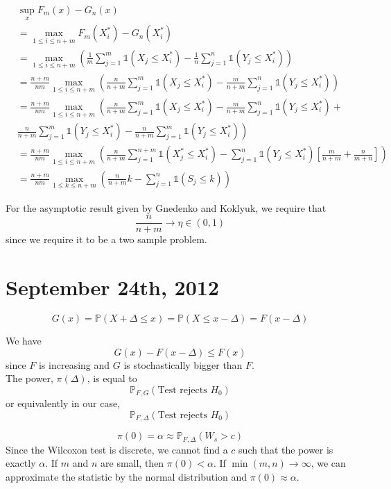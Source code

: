 \documentclass[a4paper,12pt]{amsart}
\newcommand{\p}[1]{\mathbb{P}\left(#1\right)}
\begin{document}
\begin{align*}
&\sup_x F_m(x) - G_n(x)\\
 &= \max_{1 \leq i \leq n+m} F_m(X_i^*) - G_n(X_i^*)\\
&= \max_{1 \leq i \leq n+m} \left(\frac{1}{m}\sum_{j=1}^m \mathds{1}(X_j \leq X_i^*) - \frac{1}{n}\sum_{j=1}^n \mathds{1}(Y_j \leq X_i^*)\right)\\
&= \frac{n+m}{nm}\max_{1 \leq i \leq n+m} \left(\frac{n}{n+m}\sum_{j=1}^m \mathds{1}(X_j \leq X_i^*) - \frac{m}{n+m}\sum_{j=1}^n \mathds{1}(Y_j \leq X_i^*)\right)\\
&= \frac{n+m}{nm}\max_{1 \leq i \leq n+m} \left(\frac{n}{n+m}\sum_{j=1}^m \mathds{1}(X_j \leq X_i^*) - \frac{m}{n+m}\sum_{j=1}^n \mathds{1}(Y_j \leq X_i^*) + \right.\\
&\left.\frac{n}{n+m}\sum_{j=1}^m \mathds{1}(Y_j \leq X_i^*)-\frac{n}{n+m}\sum_{j=1}^m \mathds{1}(Y_j \leq X_i^*)\right)\\
&=\frac{n+m}{nm}\max_{1 \leq i \leq n+m} \left(\frac{n}{n+m} \sum_{j=1}^{n+m} \mathds{1}(X_j^* \leq X_i^*) - \sum_{j=1}^n \mathds{1}(Y_j \leq X_i^*)\left[\frac{m}{n+m} + \frac{n}{m+n}\right]\right)\\
&= \frac{n+m}{nm}\max_{1 \leq k \leq n+m} \left(\frac{n}{n+m}k - \sum_{j=1}^n \mathds{1}(S_j \leq k) \right)
\end{align*}

For the asymptotic result given by Gnedenko and Koklyuk, we require that \[\frac{n}{n+m} \to \eta \in (0,1)\] since we require it to be a two sample problem.


\section{September 24th, 2012}
\[G(x) = \p{X + \Delta \leq x} = \p{X \leq x - \Delta} = F(x - \Delta)\]

We have
\[G(x) - F(x-\Delta) \leq F(x)\]
since $F$ is increasing and $G$ is stochastically bigger than $F$.
\\

The power, $\pi(\Delta)$, is equal to 
\[\mathbb{P}_{F,G}\left(\mbox{Test rejects } H_0\right)\]
or equivalently in our case, 
\[\mathbb{P}_{F,\Delta}\left(\mbox{Test rejects } H_0\right)\]

\[\pi(0) = \alpha \approx \mathbb{P}_{F,\Delta}(W_s > c)\]
Since the Wilcoxon test is discrete, we cannot find a $c$ such that the power is exactly $\alpha$. If $m$ and $n$ are small, then $\pi(0) < \alpha$. If $\min(m,n) \to \infty$, we can approximate the statistic by the normal distribution and $\pi(0) \approx \alpha$.
\end{document}
